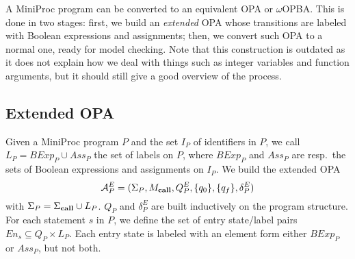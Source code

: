 \documentclass[9pt,a4paper]{article}
\begin{document}
A MiniProc program can be converted to an equivalent OPA or $\omega$OPBA.
This is done in two stages: first, we build an \emph{extended} OPA whose transitions are labeled with Boolean expressions and assignments; then, we convert such OPA to a normal one, ready for model checking.
Note that this construction is outdated as it does not explain how we deal with things such as integer variables and function arguments, but it should still give a good overview of the process.

\subsection{Extended OPA}
Given a MiniProc program $P$ and the set $I_P$ of identifiers in $P$,
we call $L_P = \mathit{BExp}_P \cup \mathit{Ass}_P$ the set of labels on $P$,
where $\mathit{BExp}_P$ and $\mathit{Ass}_P$ are resp.\ the sets of Boolean expressions and assignments on $I_P$.
We build the extended OPA
\[\mathcal{A}^E_P = (\Sigma_P, \allowbreak M_{\mathbf{call}}, \allowbreak Q^E_P, \allowbreak \{q_0\}, \allowbreak \{q_f\}, \allowbreak \delta^E_P)\]
with $\Sigma_P = \Sigma_{\mathbf{call}} \cup L_P$.
$Q_P$ and $\delta^E_P$ are built inductively on the program structure.
For each statement $s$ in $P$, we define the set of entry state/label pairs $\mathit{En}_s \subseteq Q_P \times L_P$.
Each entry state is labeled with an element form either $\mathit{BExp}_P$ or $\mathit{Ass}_P$, but not both.
\end{document}

